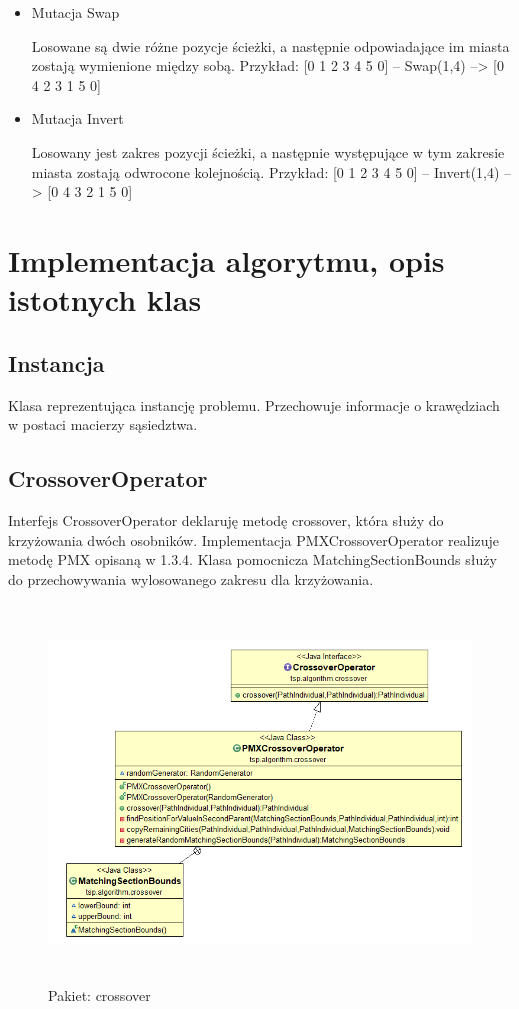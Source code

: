 \documentclass[a4paper,11pt]{article}
\begin{document}
\begin{itemize}
\item Mutacja Swap

Losowane są dwie różne pozycje ścieżki, a następnie odpowiadające im miasta zostają wymienione między sobą. 
Przykład:
[0 1 2 3 4 5 0]  -- Swap(1,4) --> [0 4 2 3 1 5 0]

\item Mutacja Invert

Losowany jest zakres pozycji ścieżki, a następnie występujące w tym zakresie miasta zostają odwrocone kolejnością.
Przykład:
[0 1 2 3 4 5 0]  -- Invert(1,4) --> [0 4 3 2 1 5 0]

\end{itemize}

\newpage
\section{Implementacja algorytmu, opis istotnych klas}
\subsection{Instancja}

Klasa reprezentująca instancję problemu. Przechowuje informacje o krawędziach w postaci macierzy sąsiedztwa.

\subsection{CrossoverOperator}

Interfejs CrossoverOperator deklaruję metodę crossover, która służy do krzyżowania dwóch osobników. Implementacja PMXCrossoverOperator realizuje metodę PMX opisaną w 1.3.4. Klasa pomocnicza MatchingSectionBounds służy do przechowywania wylosowanego zakresu dla krzyżowania.


\begin{figure}[H]
\centering
\includegraphics[height=10cm]{crossover.PNG}
\caption{Pakiet: crossover}
\end{figure}
\end{document}
